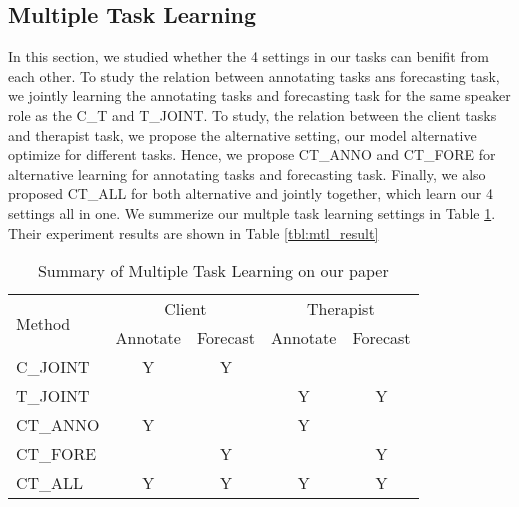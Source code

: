\subsection{Multiple Task Learning}
\label{ssec:mtl}

In this section, we studied whether the 4 settings in our tasks can benifit from each other.
To study the relation between annotating tasks ans forecasting task, we jointly learning the annotating tasks and forecasting task for the same speaker role as the C\_T and T\_JOINT.  To study, the relation between the client tasks and therapist task, we propose the alternative setting, our model alternative optimize for different tasks. Hence, we propose CT\_ANNO  and CT\_FORE for alternative learning for annotating tasks and forecasting task. Finally, we also proposed CT\_ALL for both alternative and jointly together, which learn our 4 settings all in one. We summerize our multple task learning settings in Table \ref{tbl:mtl}. Their experiment results are shown in Table \ref{tbl:mtl_result}

\begin{table}[tp]
\setlength{\tabcolsep}{3pt}
\begin{center}
\begin{tabular}{l|cc|cc}
\toprule
\hline
\multirow{2}{*}{ Method } & \multicolumn{2}{c|}{ Client } & \multicolumn{2}{c}{ Therapist } \\\cmidrule(lr){2-3}  \cmidrule(lr){4-5}
                          & Annotate                      & Forecast & Annotate & Forecast  \\ \midrule \midrule
C\_JOINT                  & Y                             & Y        &          &           \\
T\_JOINT                  &                               &          & Y        & Y         \\\midrule
CT\_ANNO                  & Y                             &          & Y        &           \\
CT\_FORE                  &                               & Y         &         & Y         \\ \midrule
CT\_ALL                   & Y                             & Y        & Y        & Y         \\ \hline
\bottomrule
\end{tabular}
\end{center}
\caption{\label{tbl:mtl} Summary of Multiple Task Learning on our paper}
\end{table}

